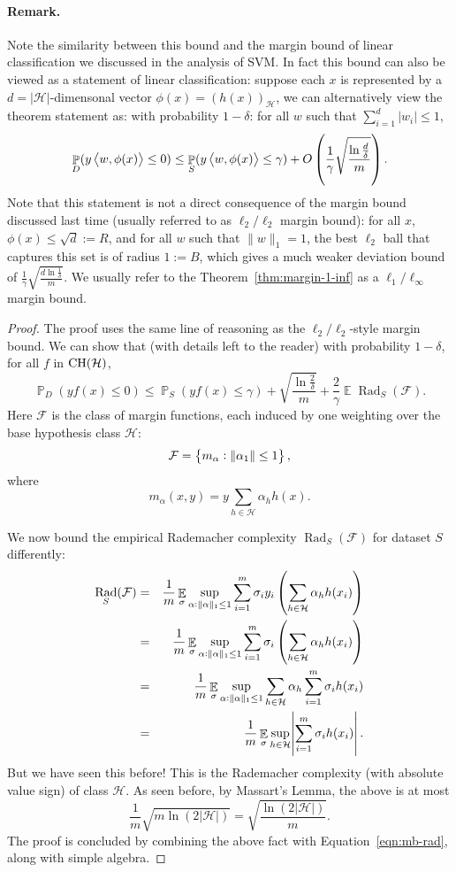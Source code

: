 \documentclass{article}
\DeclareMathOperator{\Rad}{{\mathrm{Rad}}}
\DeclareMathOperator*{\CH}{{\rm CH}}
\DeclareMathOperator{\EE}{{\mathbb E}}
\DeclareMathOperator{\PP}{{\mathbb P}}
\newcommand{\Hcal}{\mathcal{H}}
\newcommand{\Fcal}{\mathcal{F}}
\newcommand{\inner}[2]{\left\langle #1,#2 \right\rangle}
\begin{document}
\paragraph{Remark.} Note the similarity between this bound and the margin bound of linear classification we discussed in the analysis of SVM. In fact this bound can also be viewed as a statement of linear classification: suppose each $x$ is represented by a $d = |\Hcal|$-dimensonal vector $\phi(x) = (h(x))_{\Hcal}$, we can alternatively view the theorem statement as: with probability $1-\delta$: for all $w$ such that $\sum_{i=1}^d |w_i| \leq 1$,
\[ \PP_D(y\inner{w}{\phi(x)} \leq 0) \leq \PP_S(y\inner{w}{\phi(x)} \leq \gamma) + O\del{\frac{1}{\gamma}\sqrt{\frac{\ln\frac{d}{\delta}}{m}}}. \]
Note that this statement is not a direct consequence of the margin bound discussed last time (usually referred to as $\ell_2/\ell_2$ margin bound): for all $x$, $\phi(x) \leq \sqrt{d} := R$, and for all $w$ such that $\|w\|_1 = 1$, the best $\ell_2$ ball that captures this set is of radius $1 := B$, which gives a much weaker deviation bound of $\frac{1}{\gamma} \sqrt{\frac{d \ln\frac{1}{\delta}}{m}}$.
We usually refer to the Theorem~\ref{thm:margin-1-inf} as a $\ell_1/\ell_\infty$ margin bound.

\begin{proof}
The proof uses the same line of reasoning as the $\ell_2/\ell_2$-style margin bound. We can show that (with details left to the reader) with probability $1-\delta$, for all $f$ in $\CH(\Hcal)$,
\begin{equation}
  \PP_D(y f(x) \leq 0) \leq \PP_S(y f(x) \leq \gamma) +
\sqrt{\frac{\ln\frac{2}{\delta}}{m}} + \frac{2}{\gamma} \EE \Rad_S(\Fcal).
\label{eqn:mb-rad}
\end{equation}
Here $\Fcal$ is the class of margin functions, each induced by one weighting over the base hypothesis class $\Hcal$:
\[ \Fcal = \cbr{m_\alpha: \|\alpha_1\| \leq 1}, \]
where
\[ m_\alpha(x,y) = y \sum_{h \in \Hcal} \alpha_h h(x). \]

We now bound the empirical Rademacher complexity $\Rad_S(\Fcal)$ for dataset $S$ differently:
\begin{eqnarray*}
\Rad_S(\Fcal)
&=& \frac1m \EE_\sigma \sup_{\alpha: \|\alpha\|_1 \leq 1} \sum_{i=1}^m \sigma_i y_i \del{\sum_{h \in \Hcal} \alpha_h h(x_i)} \\
&=& \frac1m \EE_\sigma \sup_{\alpha: \|\alpha\|_1 \leq 1} \sum_{i=1}^m \sigma_i \del{\sum_{h \in \Hcal} \alpha_h h(x_i)} \\
&=& \frac1m \EE_\sigma \sup_{\alpha: \|\alpha\|_1 \leq 1} \sum_{h \in \Hcal} \alpha_h \sum_{i=1}^m \sigma_i h(x_i) \\
&=& \frac1m \EE_\sigma \sup_{h \in \Hcal} \abs{\sum_{i=1}^m \sigma_i h(x_i)}.
\end{eqnarray*}
But we have seen this before! This is the Rademacher complexity (with absolute value sign) of class $\Hcal$. As seen before, by Massart's Lemma, the above is at most
\[ \frac1m \sqrt{m \ln(2|\Hcal|)} = \sqrt{\frac{\ln(2|\Hcal|)}m}. \]
The proof is concluded by combining the above fact with Equation~\eqref{eqn:mb-rad}, along with simple algebra.
\end{proof}



\end{document}
